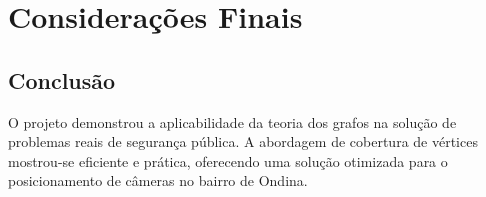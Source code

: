 \documentclass[12pt, a4paper]{report}
\begin{document}
\chapter{Considerações Finais}

\section{Conclusão}
O projeto demonstrou a aplicabilidade da teoria dos grafos na solução de problemas reais de segurança pública. A abordagem de cobertura de vértices mostrou-se eficiente e prática, oferecendo uma solução otimizada para o posicionamento de câmeras no bairro de Ondina.

\newpage
\renewcommand{\refname}{Referências Bibliográficas}

\nocite{*}
\end{document}
